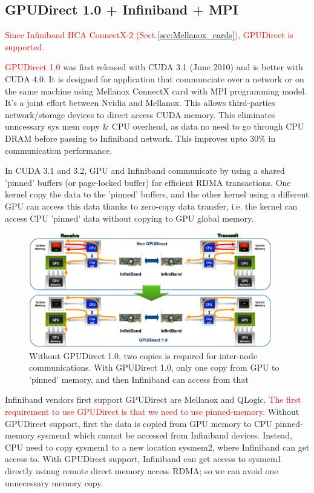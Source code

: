 \subsection{GPUDirect 1.0 + Infiniband + MPI}
\label{sec:GPUs_GPUDirect1}

\textcolor{red}{Since Infiniband HCA ConnectX-2 (Sect.\ref{sec:Mellanox_cards}),
GPUDirect is supported.}


\textcolor{red}{GPUDirect 1.0} was first released with CUDA 3.1 (June 2010) and
is better with CUDA 4.0. It is designed for application that communciate over a
network or on the same machine using Mellanox ConnectX card with MPI programming
model. It's a joint effort between Nvidia and Mellanox. This allows
third-parties network/storage devices to direct access CUDA memory. This
eliminates unncessary sys mem copy \& CPU overhead, as data no need to go
through CPU DRAM before passing to Infiniband network. This improves upto 30\%
in communication performance.

In CUDA 3.1 and 3.2, GPU and Infiniband communicate by using a shared 'pinned'
buffers (or page-locked buffer) for efficient RDMA transactions. One kernel copy
the data to the 'pinned' buffers, and the other kernel using a different GPU can
access this data thanks to zero-copy data transfer, i.e. the kernel can access
CPU 'pinned' data without copying to GPU global memory.

\begin{figure}[hbt]
      \centerline{\includegraphics[height=5cm,
    angle=0]{./images/GPUDirect_1.0.eps}}
\caption{Without GPUDirect 1.0, two copies is required for inter-node
communications. With GPUDirect 1.0, only one copy from GPU to 'pinned' memory,
and then Infiniband can access from that}
\label{fig:GPUDirect1}
\end{figure}


Infiniband vendors first support GPUDirect are Mellanox and QLogic.
\textcolor{red}{The first requirement to use GPUDirect is that we need to use
pinned-memory.} Without GPUDirect support, first the data is copied from GPU
memory to CPU pinned-memory sysmem1 which cannot be accessed from Infiniband
devices. Instead, CPU need to copy sysmem1 to a new location sysmem2, where
Infiniband can get access to. With GPUDirect support, Infiniband can get access
to sysmem1 directly usinng remote direct memory access RDMA; so we can avoid one
unnecessary memory copy.


